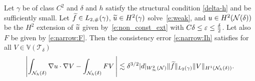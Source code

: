 \begin{lemma}\label{l:narrow:consistency_Ih}
Let $\gamma$ be of class $C^2$ and $\delta$ and $h$ satisfy the structural
condition \eqref{delta-h} and be sufficiently small. Let $\widetilde{f} \in L_{2,\#}(\gamma)$,
$\widetilde{u} \in H^2(\gamma)$ solve~\eqref{e:weak}, and $u\in H^2({\mathcal{N}(\delta)})$ be the $H^2$ extension of $\widetilde{u}$ given by~\eqref{e:non_const_ext} with $C\delta \le \varepsilon \le \frac{\delta}{2}$. Let also $F$ be given by \eqref{e:narrow:F}.
Then the consistency error \eqref{e:narrow:Ih} satisfies for all $V \in \mathbb V(\mathcal T_\delta)$
$$
\left| \int_{\mathcal N_h(\delta)} \nabla u  \cdot \nabla V - \int_{\mathcal N_h(\delta)} F V \,\right| \lesssim 
\delta^{3/2} |d|_{W^2_\infty(\mathcal N)} \| \widetilde{f} \|_{L_2(\gamma)} \|  V \|_{H^1(\mathcal N_h(\delta))}.
$$
\end{lemma}

